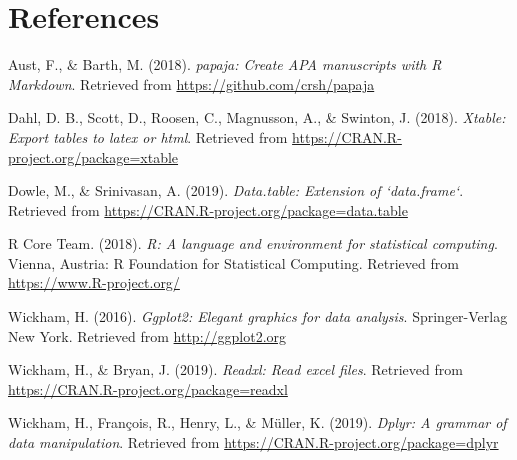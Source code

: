 \documentclass[man]{apa6}
\begin{document}
\newpage

\section{References}\label{references}

\begingroup
\setlength{\parindent}{-0.5in} \setlength{\leftskip}{0.5in}

\hypertarget{refs}{}
\hypertarget{ref-R-papaja}{}
Aust, F., \& Barth, M. (2018). \emph{papaja: Create APA manuscripts with
R Markdown}. Retrieved from \url{https://github.com/crsh/papaja}

\hypertarget{ref-R-xtable}{}
Dahl, D. B., Scott, D., Roosen, C., Magnusson, A., \& Swinton, J.
(2018). \emph{Xtable: Export tables to latex or html}. Retrieved from
\url{https://CRAN.R-project.org/package=xtable}

\hypertarget{ref-R-data.table}{}
Dowle, M., \& Srinivasan, A. (2019). \emph{Data.table: Extension of
`data.frame`}. Retrieved from
\url{https://CRAN.R-project.org/package=data.table}

\hypertarget{ref-R-base}{}
R Core Team. (2018). \emph{R: A language and environment for statistical
computing}. Vienna, Austria: R Foundation for Statistical Computing.
Retrieved from \url{https://www.R-project.org/}

\hypertarget{ref-R-ggplot2}{}
Wickham, H. (2016). \emph{Ggplot2: Elegant graphics for data analysis}.
Springer-Verlag New York. Retrieved from \url{http://ggplot2.org}

\hypertarget{ref-R-readxl}{}
Wickham, H., \& Bryan, J. (2019). \emph{Readxl: Read excel files}.
Retrieved from \url{https://CRAN.R-project.org/package=readxl}

\hypertarget{ref-R-dplyr}{}
Wickham, H., François, R., Henry, L., \& Müller, K. (2019). \emph{Dplyr:
A grammar of data manipulation}. Retrieved from
\url{https://CRAN.R-project.org/package=dplyr}

\endgroup
\end{document}
